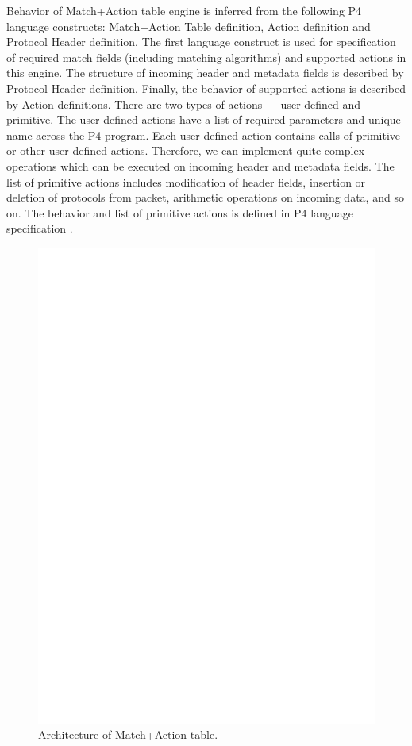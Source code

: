 Behavior of Match+Action table engine is inferred from the following P4 language constructs: Match+Action Table definition, Action definition and
Protocol Header definition. The first language construct is used for specification of required match fields (including matching algorithms)
and supported actions in this engine. The structure of incoming header and metadata fields is described by Protocol Header definition. 
Finally, the behavior of supported actions is described by Action definitions. There are two types of actions --- user defined and primitive.
The user defined actions have a list of required parameters and unique name across the P4 program. Each user defined action contains calls of 
primitive or other user defined actions. Therefore, we can implement quite complex operations which can be executed on incoming header and metadata
fields. 
The list of primitive actions includes modification of header fields, insertion or deletion of protocols from packet, 
arithmetic operations on incoming data, and so on.  
The behavior and list of primitive actions is defined in P4 language specification \cite{p4languagespec}. 

\begin{figure}[ht]
    \centering
    \includegraphics[width=\textwidth]{chapters/pic/match-action-table-architecture}
    \caption{Architecture of Match+Action table.}
    \label{fig:matchActionTableArchitecture}
\end{figure}

